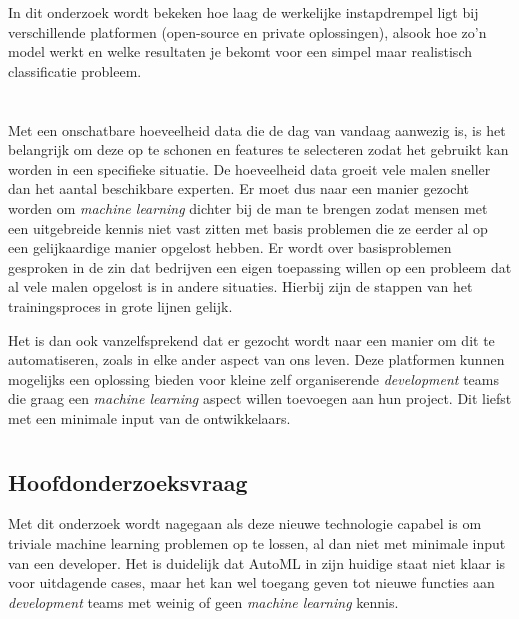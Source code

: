 In dit onderzoek wordt bekeken hoe laag de werkelijke instapdrempel ligt bij verschillende platformen (open-source en private oplossingen), alsook hoe zo'n model werkt en welke resultaten je bekomt voor een simpel maar realistisch classificatie probleem.

\section{}
\label{sec:probleemstelling}

Met een onschatbare hoeveelheid data die de dag van vandaag aanwezig is, is het belangrijk om deze op te schonen en features te selecteren zodat het gebruikt kan worden in een specifieke situatie. De hoeveelheid data groeit vele malen sneller dan het aantal beschikbare experten. Er moet dus naar een manier gezocht worden om \textit{machine learning} dichter bij de man te brengen zodat mensen met een uitgebreide kennis niet vast zitten met basis problemen die ze eerder al op een gelijkaardige manier opgelost hebben. Er wordt over basisproblemen gesproken in de zin dat bedrijven een eigen toepassing willen op een probleem dat al vele malen opgelost is in andere situaties. Hierbij zijn de stappen van het trainingsproces in grote lijnen gelijk.

Het is dan ook vanzelfsprekend dat er gezocht wordt naar een manier om dit te automatiseren, zoals in elke ander aspect van ons leven. Deze platformen kunnen mogelijks een oplossing bieden voor kleine zelf organiserende \textit{development} teams die graag een \textit{machine learning} aspect willen toevoegen aan hun project. Dit liefst met een minimale input van de ontwikkelaars.

\section{}
\label{sec:onderzoeksvraag}

\subsection{Hoofdonderzoeksvraag}
\label{subsec:hoofdonderzoeksvraag}

Met dit onderzoek wordt nagegaan als deze nieuwe technologie capabel is om triviale machine learning problemen op te lossen, al dan niet met minimale input van een developer. Het is duidelijk dat AutoML in zijn huidige staat niet klaar is voor uitdagende cases, maar het kan wel toegang geven tot nieuwe functies aan \textit{development} teams met weinig of geen \textit{machine learning} kennis.

